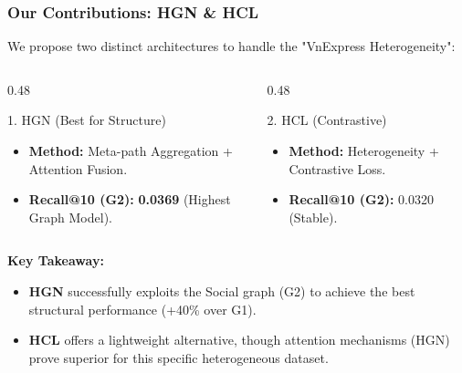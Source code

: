 \documentclass{beamer}
\begin{document}
\begin{frame}
    \frametitle{Our Contributions: HGN \& HCL}
    We propose two distinct architectures to handle the "VnExpress Heterogeneity":

    \vspace{0.2cm}
    \begin{columns}
        \begin{column}{0.48\textwidth}
            \begin{block}{1. HGN (Best for Structure)}
                \begin{itemize}
                    \item \textbf{Method:} Meta-path Aggregation + Attention Fusion.
                    \item \textbf{Recall@10 (G2):} \textbf{0.0369} (Highest Graph Model).
                \end{itemize}
            \end{block}
        \end{column}
        \begin{column}{0.48\textwidth}
            \begin{block}{2. HCL (Contrastive)}
                \begin{itemize}
                    \item \textbf{Method:} Heterogeneity + Contrastive Loss.
                    \item \textbf{Recall@10 (G2):} 0.0320 (Stable).
                \end{itemize}
            \end{block}
        \end{column}
    \end{columns}

    \vspace{0.3cm}
    \textbf{Key Takeaway:}
    \begin{itemize}
        \item \textbf{HGN} successfully exploits the Social graph (G2) to achieve the best structural performance (+40\% over G1).
        \item \textbf{HCL} offers a lightweight alternative, though attention mechanisms (HGN) prove superior for this specific heterogeneous dataset.
    \end{itemize}
\end{frame}
\end{document}
